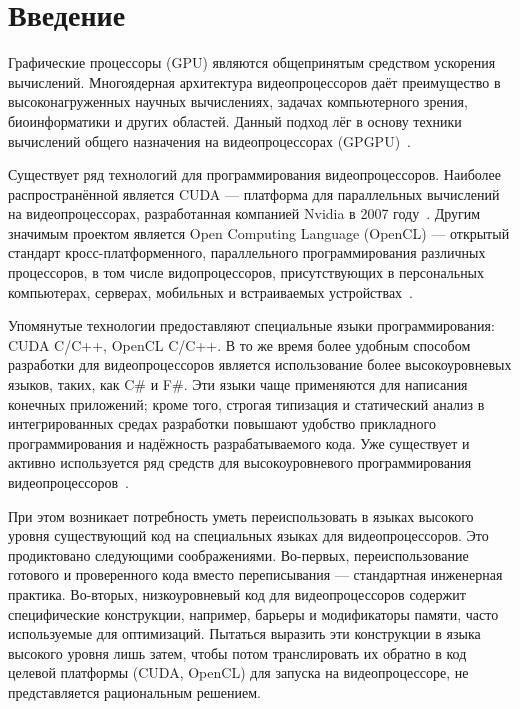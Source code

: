 \documentclass[14pt]{matmex-diploma}
\begin{document}
\maketitle

\tableofcontents

\section*{Введение}
Графические процессоры (GPU) являются общепринятым средством ускорения вычислений. Многоядерная архитектура видеопроцессоров даёт преимущество в высоконагруженных научных вычислениях, задачах компьютерного зрения, биоинформатики и других областей. Данный подход лёг в основу техники вычислений общего назначения на видеопроцессорах (GPGPU)~\cite{CUDA_to_OpenCL, GPGPU_1}.

Существует ряд технологий для программирования видеопроцессоров. Наиболее распространённой является CUDA --- платформа для параллельных вычислений на видеопроцессорах, разработанная компанией Nvidia в 2007 году~\cite{CUDA}. Другим значимым проектом является Open Computing Language (OpenCL) --- открытый стандарт кросс-платформенного, параллельного программирования различных процессоров, в том числе видопроцессоров, присутствующих в персональных компьютерах, серверах, мобильных и встраиваемых устройствах~\cite{OpenCL}.

Упомянутые технологии предоставляют специальные языки программирования: CUDA C/C++, OpenCL C/C++. В то же время более удобным способом разработки для видеопроцессоров является использование более высокоуровневых языков, таких, как C\# и F\#. Эти языки чаще применяются для написания конечных приложений; кроме того, строгая типизация и статический анализ в интегрированных средах разработки повышают удобство прикладного программирования и надёжность разрабатываемого кода. Уже существует и активно используется ряд средств для высокоуровневого программирования видеопроцессоров~\cite{Brahma_FSharp, FSCL, AleaGPU}.

При этом возникает потребность уметь переиспользовать в языках высокого уровня существующий код на специальных языках для видеопроцессоров. Это продиктовано следующими соображениями. Во-первых, переиспользование готового и проверенного кода вместо переписывания --- стандартная инженерная практика. Во-вторых, низкоуровневый код для видеопроцессоров содержит специфические конструкции, например, барьеры и модификаторы памяти, часто используемые для оптимизаций. Пытаться выразить эти конструкции в языка высокого уровня лишь затем, чтобы потом транслировать их обратно в код целевой платформы (CUDA, OpenCL) для запуска на видеопроцессоре, не представляется рациональным решением.
\end{document}
